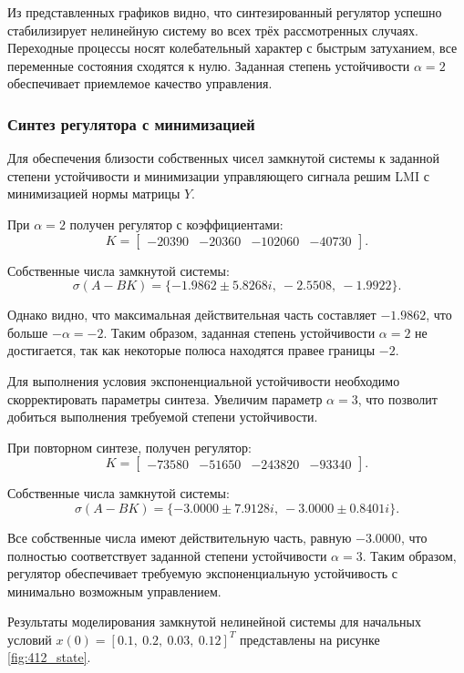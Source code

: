 \documentclass[a4paper,12pt]{article}
\begin{document}
Из представленных графиков видно, что синтезированный регулятор успешно стабилизирует нелинейную систему во всех трёх рассмотренных случаях. Переходные процессы носят колебательный характер с быстрым затуханием, все переменные состояния сходятся к нулю. Заданная степень устойчивости \(\alpha = 2\) обеспечивает приемлемое качество управления.	
	
	
\subsubsection{Синтез регулятора с минимизацией}

Для обеспечения близости собственных чисел замкнутой системы к заданной степени устойчивости и минимизации управляющего сигнала решим LMI с минимизацией нормы матрицы \(Y\).

При \(\alpha = 2\) получен регулятор с коэффициентами:
\[
K = \begin{bmatrix}
	-20390 & -20360 & -102060 & -40730
\end{bmatrix}.
\]

Собственные числа замкнутой системы:
\[
\sigma(A - BK) = \{-1.9862 \pm 5.8268i,\ -2.5508,\ -1.9922\}.
\]

Однако видно, что максимальная действительная часть составляет \(-1.9862\), что больше \(-\alpha = -2\). Таким образом, заданная степень устойчивости \(\alpha = 2\) не достигается, так как некоторые полюса находятся правее границы \(-2\).

Для выполнения условия экспоненциальной устойчивости необходимо скорректировать параметры синтеза. Увеличим параметр \(\alpha=3\), что позволит добиться выполнения требуемой степени устойчивости.

При повторном синтезе, получен регулятор:
\[
K = \begin{bmatrix}
	-73580 & -51650 & -243820 & -93340
\end{bmatrix}.
\]

Собственные числа замкнутой системы:
\[
\sigma(A - BK) = \{-3.0000 \pm 7.9128i,\ -3.0000 \pm 0.8401i\}.
\]

Все собственные числа имеют действительную часть, равную \(-3.0000\), что полностью соответствует заданной степени устойчивости \(\alpha = 3\). Таким образом, регулятор обеспечивает требуемую экспоненциальную устойчивость с минимально возможным управлением.

Результаты моделирования замкнутой нелинейной системы для начальных условий \(x(0) = [0.1,\ 0.2,\ 0.03,\ 0.12]^T\) представлены на рисунке \ref{fig:412_state}.
\end{document}
